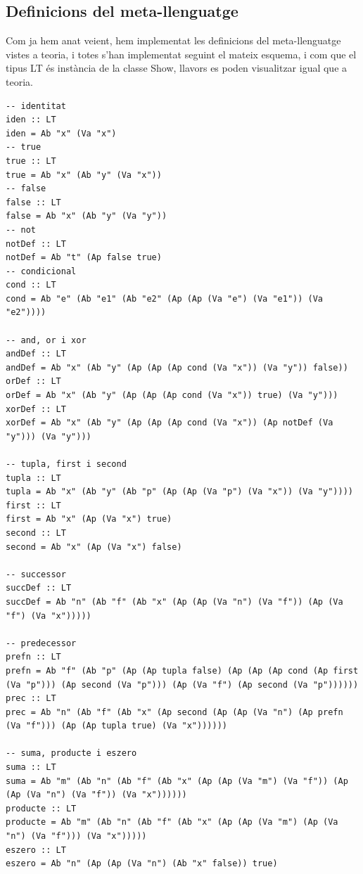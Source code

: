 \documentclass[10pt,a4paper]{article}
\begin{document}
\clearpage

\subsection{Definicions del meta-llenguatge}

Com ja hem anat veient, hem implementat les definicions del meta-llenguatge vistes a teoria, i totes s'han implementat seguint el mateix esquema, i com que el tipus LT és instància de la classe Show, llavors es poden visualitzar igual que a teoria.

\lstset{language=Haskell, breaklines=true, basicstyle=\footnotesize}
\begin{lstlisting}[frame=mystyle]
-- identitat
iden :: LT
iden = Ab "x" (Va "x")
-- true
true :: LT
true = Ab "x" (Ab "y" (Va "x"))
-- false
false :: LT
false = Ab "x" (Ab "y" (Va "y"))
-- not
notDef :: LT
notDef = Ab "t" (Ap false true)
-- condicional
cond :: LT
cond = Ab "e" (Ab "e1" (Ab "e2" (Ap (Ap (Va "e") (Va "e1")) (Va "e2"))))

-- and, or i xor
andDef :: LT
andDef = Ab "x" (Ab "y" (Ap (Ap (Ap cond (Va "x")) (Va "y")) false))
orDef :: LT
orDef = Ab "x" (Ab "y" (Ap (Ap (Ap cond (Va "x")) true) (Va "y")))
xorDef :: LT
xorDef = Ab "x" (Ab "y" (Ap (Ap (Ap cond (Va "x")) (Ap notDef (Va "y"))) (Va "y")))

-- tupla, first i second
tupla :: LT
tupla = Ab "x" (Ab "y" (Ab "p" (Ap (Ap (Va "p") (Va "x")) (Va "y"))))
first :: LT
first = Ab "x" (Ap (Va "x") true)
second :: LT
second = Ab "x" (Ap (Va "x") false)

-- successor
succDef :: LT
succDef = Ab "n" (Ab "f" (Ab "x" (Ap (Ap (Va "n") (Va "f")) (Ap (Va "f") (Va "x")))))

-- predecessor
prefn :: LT
prefn = Ab "f" (Ab "p" (Ap (Ap tupla false) (Ap (Ap (Ap cond (Ap first (Va "p"))) (Ap second (Va "p"))) (Ap (Va "f") (Ap second (Va "p"))))))
prec :: LT
prec = Ab "n" (Ab "f" (Ab "x" (Ap second (Ap (Ap (Va "n") (Ap prefn (Va "f"))) (Ap (Ap tupla true) (Va "x"))))))

-- suma, producte i eszero
suma :: LT
suma = Ab "m" (Ab "n" (Ab "f" (Ab "x" (Ap (Ap (Va "m") (Va "f")) (Ap (Ap (Va "n") (Va "f")) (Va "x"))))))
producte :: LT
producte = Ab "m" (Ab "n" (Ab "f" (Ab "x" (Ap (Ap (Va "m") (Ap (Va "n") (Va "f"))) (Va "x")))))
eszero :: LT
eszero = Ab "n" (Ap (Ap (Va "n") (Ab "x" false)) true)
\end{lstlisting}

\clearpage
\end{document}
